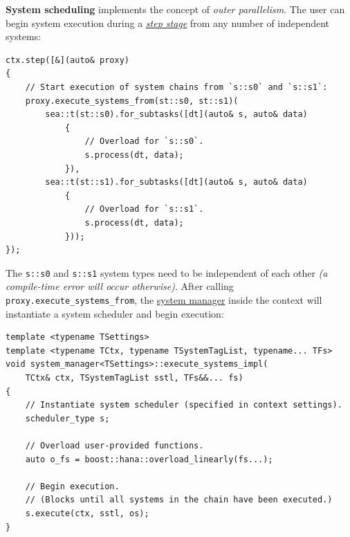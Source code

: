 \documentclass[twoside, 12pt, a4paper, openany]{book}
\begin{document}
\textbf{System scheduling} implements the concept of \emph{outer
parallelism}. The user can begin system execution during a
\protect\hyperlink{step_stage}{\emph{step stage}} from any number of
independent systems:

\begin{verbatim}
ctx.step([&](auto& proxy)
{
    // Start execution of system chains from `s::s0` and `s::s1`:
    proxy.execute_systems_from(st::s0, st::s1)(
        sea::t(st::s0).for_subtasks([dt](auto& s, auto& data)
            {
                // Overload for `s::s0`.
                s.process(dt, data);
            }),
        sea::t(st::s1).for_subtasks([dt](auto& s, auto& data)
            {
                // Overload for `s::s1`.
                s.process(dt, data);
            }));
});
\end{verbatim}

The
\texttt{s::s0}
and
\texttt{s::s1}
system types need to be independent of each other \emph{(a compile-time
error will occur otherwise)}. After calling
\texttt{proxy.execute_systems_from},
the \protect\hyperlink{architecture_system_mgr}{system manager} inside
the context will instantiate a system scheduler and begin execution:

\begin{verbatim}
template <typename TSettings>
template <typename TCtx, typename TSystemTagList, typename... TFs>
void system_manager<TSettings>::execute_systems_impl(
    TCtx& ctx, TSystemTagList sstl, TFs&&... fs)
{
    // Instantiate system scheduler (specified in context settings).
    scheduler_type s;

    // Overload user-provided functions.
    auto o_fs = boost::hana::overload_linearly(fs...);

    // Begin execution.
    // (Blocks until all systems in the chain have been executed.)
    s.execute(ctx, sstl, os);
}
\end{verbatim}
\end{document}

